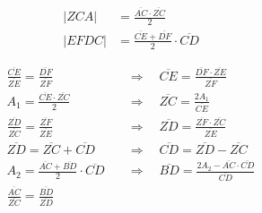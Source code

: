 \begin{exercise}
\begin{minipage}{7cm}
%
    \end{minipage}%
    \hfill
    \begin{minipage}{8cm}%
      \begin{equation*}
        \begin{split}
          |ZCA|&=\frac{\overline{AC}\cdot\overline{ZC}}{2}\\[2ex]
          |EFDC|&=\frac{\overline{CE}+\overline{DF}}{2}\cdot\overline{CD}
        \end{split}
      \end{equation*}
    \end{minipage}\par
    \begin{equation*}
      \begin{split}
        \frac{\overline{CE}}{\overline{ZE}}=\frac{\overline{DF}}{\overline{ZF}}
        &\quad\Rightarrow\quad
        \overline{CE}=\frac{\overline{DF}\cdot\overline{ZE}}{\overline{ZF}}
        \\[2ex]
        A_1=\frac{\overline{CE}\cdot\overline{ZC}}{2}
        &\quad\Rightarrow\quad
        \overline{ZC}=\frac{2A_1}{\overline{CE}}
        \\[2ex]
        \frac{\overline{ZD}}{\overline{ZC}}=\frac{\overline{ZF}}{\overline{ZE}}
        &\quad\Rightarrow\quad
        \overline{ZD}=\frac{\overline{ZF}\cdot\overline{ZC}}{\overline{ZE}}
        \\[2ex]
        \overline{ZD}=\overline{ZC}+\overline{CD}
        &\quad\Rightarrow\quad
        \overline{CD}=\overline{ZD}-\overline{ZC}
        \\[2ex]
        A_2=\frac{\overline{AC}+\overline{BD}}{2}\cdot\overline{CD}
        &\quad\Rightarrow\quad
        \overline{BD}=\frac{2A_2-\overline{AC}\cdot\overline{CD}}{\overline{CD}}
        \\[2ex]
        \frac{\overline{AC}}{\overline{ZC}}=\frac{\overline{BD}}{\overline{ZD}}

\end{split}
\end{equation*}
\end{exercise}
